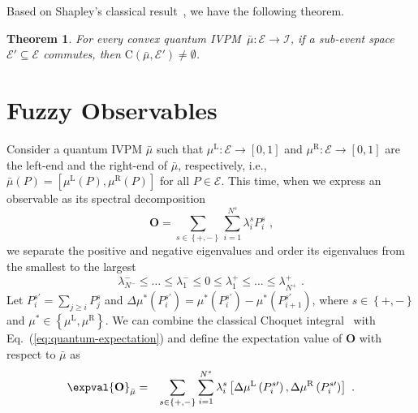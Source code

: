 \documentclass[english,reprint, aps, prl,superscriptaddress, showpacs,
showkeys, longbibliography, amsmath, amssymb]{revtex4-1}
\theoremstyle{plain}
\newtheorem{thm}{Theorem}
\theoremstyle{definition}
\newcommand{\events}{\ensuremath{\mathcal{E}}}
\newcommand{\coreBorn}{\ensuremath{\mathrm{C}}}
\newcommand{\mul}[1][]{\ensuremath{\mu^{\mathrm{L{#1}}}}}
\newcommand{\mur}[1][]{\ensuremath{\mu^{\mathrm{R{#1}}}}}
\begin{document}
Based on Shapley's classical result~\cite{Shapley1971,GilboaSchmeidler1994,Grabisch2016},
we have the following theorem.

\begin{thm}\label{thm:Shapley}For every convex quantum IVPM~$\bar{\mu}:\events\rightarrow\mathscr{I}$,
if a sub-event space~$\events'\subseteq\events$ commutes, then $\coreBorn\left(\bar{\mu},\events'\right)\ne\emptyset$.\end{thm}

\section{Fuzzy Observables}
 
Consider a quantum IVPM $\bar{\mu}$ such that $\mul:\events\rightarrow\left[0,1\right]$
and $\mur:\events\rightarrow\left[0,1\right]$ are the left-end and
the right-end of $\bar{\mu}$, respectively, i.e., $\bar{\mu}\left(P\right)=\left[\mul\left(P\right),\mur\left(P\right)\right]$
for all $P\in\events$. This time, when we express an observable as
its spectral decomposition
\begin{equation}
\mathbf{O}=\sum_{s\in\left\{ +,-\right\} }\sum_{i=1}^{N^{s}}\lambda_{i}^{s}P_{i}^{s}\textrm{ ,}\label{eq:spectrum-decomposition}
\end{equation}
we separate the positive and negative eigenvalues and order its eigenvalues
from the smallest to the largest 
\begin{equation}
\lambda_{N^{-}}^{-}\le\ldots\le\lambda_{1}^{-}\le0\le\lambda_{1}^{+}\le\ldots\le\lambda_{N^{+}}^{+}\textrm{ .}
\end{equation}
Let $P_{i}^{s\prime}=\sum_{j\ge i}P_{j}^{s}$ and $\Delta\mu^{*}\left(P_{i}^{s\prime}\right)=\mu^{*}\left(P_{i}^{s\prime}\right)-\mu^{*}\left(P_{i+1}^{s\prime}\right)$,
where $s\in\left\{ +,-\right\} $ and $\mu^{*}\in\left\{ \mul,\mur\right\} $.
We can combine the classical Choquet integral~\cite{Vitali1925,Choquet1954,GilboaSchmeidler1994,Grabisch2016}
with Eq.~(\ref{eq:quantum-expectation}) and define the expectation
value of $\mathbf{O}$ with respect to $\bar{\mu}$ as
\begin{eqnarray}
\expval{\mathbf{O}}_{\bar{\mu}} & = & \sum_{s\in\left\{ +,-\right\} }\sum_{i=1}^{N^{s}}\lambda_{i}^{s}\left[\Delta\mul\left(P_{i}^{s\prime}\right),\Delta\mur\left(P_{i}^{s\prime}\right)\right]\textrm{ .}\label{eq:quantum-interval-expectation}
\end{eqnarray}
\end{document}
